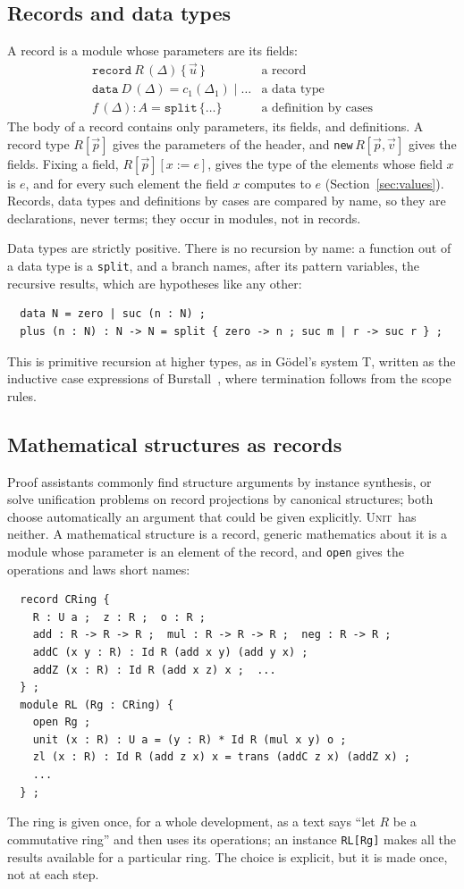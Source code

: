 \documentclass[11pt]{article}
\newcommand{\sys}{\textsc{Unit}}
\newcommand{\kw}[1]{\texttt{#1}}
\begin{document}
\subsection{Records and data types}

A record is a module whose parameters are its fields:
\[
\begin{array}{ll}
\kw{record}\ R\,(\Delta)\,\{\,\vec u\,\} & \text{a record}\\
\kw{data}\ D\,(\Delta) = c_1(\Delta_1)\mid\dots & \text{a data type}\\
f\,(\Delta) : A = \kw{split}\,\{\dots\} & \text{a definition by cases}
\end{array}
\]
The body of a record contains only parameters, its fields, and
definitions. A record type $R[\vec p]$ gives the parameters of the
header, and \kw{new}\,$R[\vec p,\vec v]$ gives the fields. Fixing a
field, $R[\vec p][x:=e]$, gives the type of the elements whose field $x$
is $e$, and for every such element the field $x$ computes to $e$
(Section~\ref{sec:values}). Records, data types and definitions by
cases are compared by name, so they are declarations, never terms; they
occur in modules, not in records.

Data types are strictly positive. There is no recursion by name: a
function out of a data type is a \kw{split}, and a branch names, after
its pattern variables, the recursive results, which are hypotheses like
any other:
\begin{verbatim}
  data N = zero | suc (n : N) ;
  plus (n : N) : N -> N = split { zero -> n ; suc m | r -> suc r } ;
\end{verbatim}
This is primitive recursion at higher types, as in G\"odel's system T,
written as the inductive case expressions of Burstall~\cite{Burstall},
where termination follows from the scope rules.

\subsection{Mathematical structures as records}\label{sec:structures}

Proof assistants commonly find structure arguments by instance
synthesis, or solve unification problems on record projections by
canonical structures; both choose automatically an argument that could
be given explicitly.
\sys\ has neither. A mathematical structure is a record, generic
mathematics about it is a module whose parameter is an element of the
record, and \kw{open} gives the operations and laws short names:
\begin{verbatim}
  record CRing {
    R : U a ;  z : R ;  o : R ;
    add : R -> R -> R ;  mul : R -> R -> R ;  neg : R -> R ;
    addC (x y : R) : Id R (add x y) (add y x) ;
    addZ (x : R) : Id R (add x z) x ;  ...
  } ;
  module RL (Rg : CRing) {
    open Rg ;
    unit (x : R) : U a = (y : R) * Id R (mul x y) o ;
    zl (x : R) : Id R (add z x) x = trans (addC z x) (addZ x) ;
    ...
  } ;
\end{verbatim}
The ring is given once, for a whole development, as a text says ``let
$R$ be a commutative ring'' and then uses its operations; an instance
\kw{RL[Rg]} makes all the results available for a particular ring. The
choice is explicit, but it is made once, not at each step.
\end{document}
